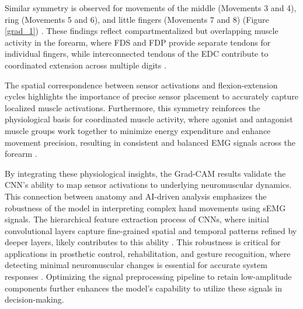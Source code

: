 \documentclass[preprint,12pt]{elsarticle}
\begin{document}
Similar symmetry is observed for movements of the middle (Movements 3 and 4), ring (Movements 5 and 6), and little fingers (Movements 7 and 8) (Figure \ref{grad_1}) . These findings reflect compartmentalized but overlapping muscle activity in the forearm, where FDS and FDP provide separate tendons for individual fingers, while interconnected tendons of the EDC contribute to coordinated extension across multiple digits \cite{Leijnse}.

The spatial correspondence between sensor activations and flexion-extension cycles highlights the importance of precise sensor placement to accurately capture localized muscle activations. Furthermore, this symmetry reinforces the physiological basis for coordinated muscle activity, where agonist and antagonist muscle groups work together to minimize energy expenditure and enhance movement precision, resulting in consistent and balanced EMG signals across the forearm \cite{Enoka}.

By integrating these physiological insights, the Grad-CAM results validate the CNN's ability to map sensor activations to underlying neuromuscular dynamics. This connection between anatomy and AI-driven analysis emphasizes the robustness of the model in interpreting complex hand movements using sEMG signals. The hierarchical feature extraction process of CNNs, where initial convolutional layers capture fine-grained spatial and temporal patterns refined by deeper layers, likely contributes to this ability \cite{liu}. This robustness is critical for applications in prosthetic control, rehabilitation, and gesture recognition, where detecting minimal neuromuscular changes is essential for accurate system responses \cite{putcha}. Optimizing the signal preprocessing pipeline to retain low-amplitude components further enhances the model's capability to utilize these signals in decision-making.

\end{document}
